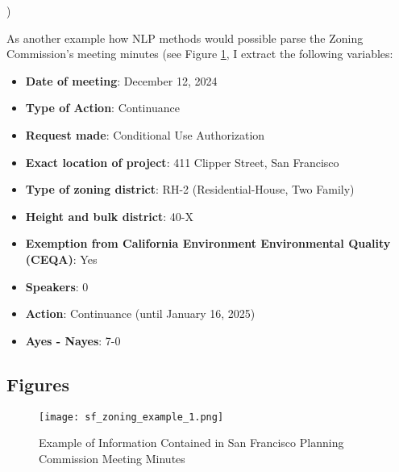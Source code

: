 )\documentclass{article}[11pt]
\begin{document}
As another example how NLP methods would possible parse the Zoning Commission's meeting minutes (see Figure \ref{sf_zoning_example_1}, I extract the following variables:
\begin{itemize}
	\item \textbf{Date of meeting}: December 12, 2024
	\item \textbf{Type of Action}: Continuance
	\item \textbf{Request made}: Conditional Use Authorization
	\item \textbf{Exact location of project}: 411 Clipper Street, San Francisco
	\item \textbf{Type of zoning district}: RH-2 (Residential-House, Two Family)
	\item \textbf{Height and bulk district}: 40-X
	\item \textbf{Exemption from California Environment Environmental Quality (CEQA)}: Yes
	\item \textbf{Speakers}: 0
	\item \textbf{Action}: Continuance (until January 16, 2025)
	\item \textbf{Ayes - Nayes}: 7-0 
\end{itemize}

	\subsection{Figures}
	
		\begin{figure}[h]
		\centering
			\texttt{[image: sf\_zoning\_example\_1.png]}
			\caption{Example of Information Contained in San Francisco Planning Commission Meeting Minutes}
			\label{sf_zoning_example_1}
		\end{figure}
	
\clearpage
\printbibliography
\end{document}
